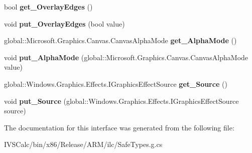 \begin{DoxyCompactItemize}
bool {\bfseries get\+\_\+\+Overlay\+Edges} ()
\item 
\mbox{\label{interface_microsoft_1_1_graphics_1_1_canvas_1_1_effects_1_1_i_edge_detection_effect_a14bee1ac205a14649a9a545112bce70b}} 
void {\bfseries put\+\_\+\+Overlay\+Edges} (bool value)
\item 
\mbox{\label{interface_microsoft_1_1_graphics_1_1_canvas_1_1_effects_1_1_i_edge_detection_effect_a54398098083bcd5796ae07a6f2ec7377}} 
global\+::\+Microsoft.\+Graphics.\+Canvas.\+Canvas\+Alpha\+Mode {\bfseries get\+\_\+\+Alpha\+Mode} ()
\item 
\mbox{\label{interface_microsoft_1_1_graphics_1_1_canvas_1_1_effects_1_1_i_edge_detection_effect_af3adb48dad25fee5872063bee9eb520d}} 
void {\bfseries put\+\_\+\+Alpha\+Mode} (global\+::\+Microsoft.\+Graphics.\+Canvas.\+Canvas\+Alpha\+Mode value)
\item 
\mbox{\label{interface_microsoft_1_1_graphics_1_1_canvas_1_1_effects_1_1_i_edge_detection_effect_ae9990d79f4ea9a1bfe5d4eff9af1bb83}} 
global\+::\+Windows.\+Graphics.\+Effects.\+I\+Graphics\+Effect\+Source {\bfseries get\+\_\+\+Source} ()
\item 
\mbox{\label{interface_microsoft_1_1_graphics_1_1_canvas_1_1_effects_1_1_i_edge_detection_effect_ad421800073d091d86a8396aaca06ed81}} 
void {\bfseries put\+\_\+\+Source} (global\+::\+Windows.\+Graphics.\+Effects.\+I\+Graphics\+Effect\+Source source)
\end{DoxyCompactItemize}


The documentation for this interface was generated from the following file\+:\begin{DoxyCompactItemize}
\item 
I\+V\+S\+Calc/bin/x86/\+Release/\+A\+R\+M/ilc/Safe\+Types.\+g.\+cs\end{DoxyCompactItemize}
